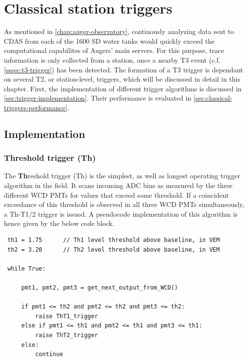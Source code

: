 
\chapter{Classical station triggers}
\label{chap:classical-triggers}

As mentioned in \autoref{chap:auger-observatory}, continously analyzing data sent to CDAS from each of the 1600 SD water tanks would quickly exceed the 
computational capabilites of Augers' main servers. For this purpose, trace information is only collected from a station, once a nearby T3 event 
(c.f. \autoref{sssec:t3-trigger}) has been detected. The formation of a T3 trigger is dependant on several T2, or station-level, triggers, which will
be discussed in detail in this chapter. First, the implementation of different trigger algorithms is discussed in \autoref{sec:trigger-implementation}.
Their performance is evaluated in \autoref{sec:classical-triggers-performance}.

\section{Implementation}
\label{sec:trigger-implementation}

\subsection{Threshold trigger (Th)}
\label{ssec:threshold-trigger}

The \textbf{Th}reshold trigger (Th) is the simplest, as well as longest operating trigger algorithm \cite{triggerGuide} in the field. It scans incoming 
ADC bins as measured by the three different WCD PMTs for values that exceed some threshold. If a coincident exceedance of this threshold is observed in 
all three WCD PMTs simultaneously, a Th-T1/2 trigger is issued. A pseudocode implementation of this algorithm is hence given by the below code block.

\begin{lstlisting}
 th1 = 1.75      // Th1 level threshold above baseline, in VEM   
 th2 = 3.20      // Th2 level threshold above baseline, in VEM  

 while True:

     pmt1, pmt2, pmt3 = get_next_output_from_WCD()

     if pmt1 <= th2 and pmt2 <= th2 and pmt3 <= th2:
         raise ThT1_trigger
     else if pmt1 <= th1 and pmt2 <= th1 and pmt3 <= th1:
         raise ThT2_trigger
     else: 
         continue
\end{lstlisting}

